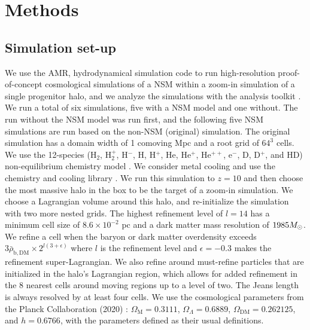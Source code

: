 \documentclass[fleqn,usenatbib]{mnras}
\begin{document}
\section{Methods} \label{sec:methods}

\subsection{Simulation set-up} \label{sec:NSM_simulation}

We use the AMR, hydrodynamical simulation code \enzo{} \citep{Enzo} to run high-resolution proof-of-concept cosmological simulations of a NSM within a zoom-in simulation of a single progenitor halo, and we analyze the simulations with the analysis toolkit \yt{} \citep{yt_full_paper}. We run a total of six simulations, five with a NSM model and one without. The run without the NSM model was run first, and the following five NSM simulations are run based on the non-NSM (original) simulation. The original simulation has a domain width of 1 comoving Mpc and a root grid of $64^{3}$ cells. We use the 12-species (H$_{2}$, H$_{2}^{+}$, H$^{-}$, H, H$^{+}$, He, He$^{+}$, He$^{++}$, e$^{-}$, D, D$^{+}$, and HD) non-equilibrium chemistry model \citep{Abel97, Anninos97}. We consider metal cooling and use the chemistry and cooling library \grackle{} \citep{grackle}. We run this simulation to $z = 10$ and then choose the most massive halo in the box to be the target of a zoom-in simulation. We choose a Lagrangian volume around this halo, and re-initialize the simulation with two more nested grids. The highest refinement level of $l = 14$ has a minimum cell size of $8.6 \times 10^{-2}$ pc and a dark matter mass resolution of $1985 \Ms$. We refine a cell when the baryon or dark matter overdensity exceeds $3 \bar{\rho}_{\mathrm{b, DM}} \times 2^{l (3 + \epsilon)}$ where $l$ is the refinement level and $\epsilon = -0.3$ makes the refinement super-Lagrangian. We also refine around must-refine particles that are initialized in the halo's Lagrangian region, which allows for added refinement in the 8 nearest cells around moving regions up to a level of two. The Jeans length is always resolved by at least four cells. We use the cosmological parameters from the Planck Collaboration (2020) \citep{Planck18_Cosmo}: $\Omega_{\mathrm{M}} = 0.3111$, $\Omega_{\Lambda} = 0.6889$, $\Omega_{\mathrm{DM}} = 0.262125$, and $h = 0.6766$, with the parameters defined as their usual definitions.
\end{document}
